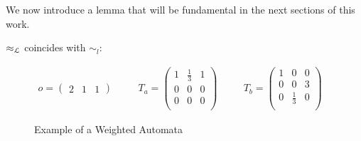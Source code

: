 We now introduce a lemma that will be fundamental in the next sections of this work.

\begin{lem}
  \label{lem:coincide}
  $\approx_{\mathcal{L}}$ coincides with $\sim_l$: 

\end{lem}

\begin{figure}[htbp!]
  \centering
  
  \begin{equation*}
    \begin{aligned}
      o = \begin{pmatrix}
        2 & 1 & 1
      \end{pmatrix} & \quad &  
      T_a = \begin{pmatrix}
        1 & \frac{1}{3} & 1 \\ 
        0 & 0 & 0 \\
        0 & 0 & 0 \\ 
      \end{pmatrix} & \quad &
      T_b = \begin{pmatrix}
        1 & 0 & 0 \\ 
        0 & 0 & 3 \\
        0 & \frac{1}{3} & 0 \\ 
      \end{pmatrix} & \quad &
    \end{aligned}
  \end{equation*}
  \caption{Example of a Weighted Automata}
  \label{fig:autexmp}
\end{figure}